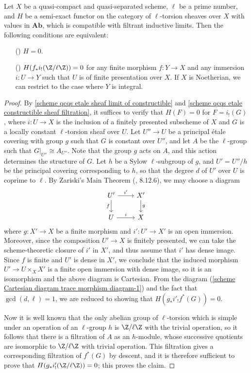 \begin{proposition}\label{scheme qcqs semi-exact functor on etale zero iff}
Let $X$ be a quasi-compact and quasi-separated scheme, $\ell$ be a prime number, and $H$ be a semi-exact functor on the category of $\ell$-torsion sheaves over $X$ with values in $\mathbf{Ab}$, which is compatible with filtrant inductive limits. Then the following conditions are equivalent:
\begin{enumerate} 
    \item[(\rmnum{1})] $H=0$.
    \item[(\rmnum{2})] $H(f_*i_!(\Z/\ell\Z))=0$ for any finite morphism $f:Y\to X$ and any immersion $i:U\to Y$ such that $U$ is of finite presentation over $X$. If $X$ is Noetherian, we can restrict to the case where $Y$ is integral.
\end{enumerate}
 
\end{proposition}
\begin{proof}
By \cref{scheme qcqs etale sheaf limit of constructible} and \cref{scheme qcqs etale constructible sheaf filtration}, it suffices to verify that $H(F)=0$ for $F=i_!(G)$, where $i:U\to X$ is the inclusion of a finitely presented subscheme of $X$ and $G$ is a locally constant $\ell$-torsion sheaf over $U$. Let $U''\to U$ be a principal \'etale covering with group $g$ such that $G$ is constant over $U''$, and let $A$ be the $\ell$-group such that $G|_{U''}\cong A_{U''}$. Note that the group $g$ acts on $A$, and this action determines the structure of $G$. Let $h$ be a Sylow $\ell$-subgroup of $g$, and $U'=U''/h$ be the principal covering corresponding to $h$, so that the degree $d$ of $U'$ over $U$ is coprime to $\ell$. By Zariski's Main Theorem (\cite{EGA4}, 8.12.6), we may choose a diagram
\[\begin{tikzcd}
U'\ar[d,swap,"f"]\ar[r,"i'"]&X'\ar[d,"g"]\\
U\ar[r,"i"]&X
\end{tikzcd}\]
where $g:X'\to X$ be a finite morphism and $i':U'\to X'$ is an open immersion. Moreover, since the composition $U'\to X$ is finitely presented, we can take the scheme-theoretic closure of $i'$ in $X'$, and thus assume that $i'$ has dense image. Since $f$ is finite and $U'$ is dense in $X'$, we conclude that the induced morphism $U'\to U\times_XX'$ is a finite open immersion with dense image, so it is an isomorphism and the above diagram is Cartesian. From the diagram (\ref{scheme Cartesian diagram trace morphism diagram-1}) and the fact that $\gcd(d,\ell)=1$, we are reduced to showing that $H(g_*i'_!f^*(G))=0$.\par
Now it is well known that the only abelian group of $\ell$-torsion which is simple under an operation of an $\ell$-group $h$ is $\Z/\ell\Z$ with the trivial operation, so it follows that there is a filtration of $A$ as an $h$-module, whose successive quotients are isomorphic to $\Z/\ell\Z$ with trivial operation. This filtration gives a corresponding filtration of $f^*(G)$ by descent, and it is therefore sufficient to prove that $H(g_*i'_!(\Z/\ell\Z))=0$; this proves the claim.
\end{proof}

